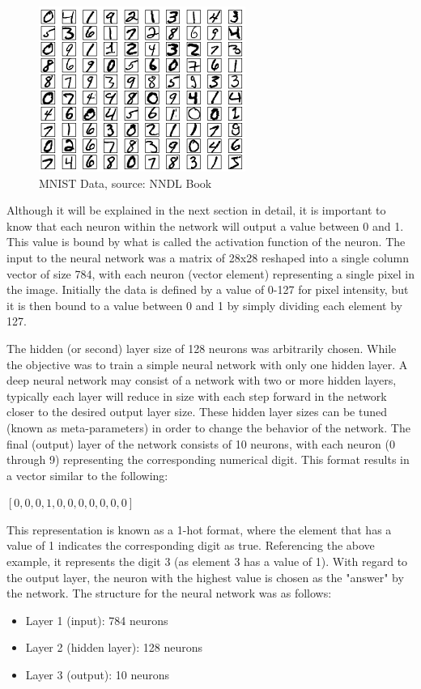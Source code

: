 \documentclass[11pt]{article}
\begin{document}
\begin{figure}[H]
	\centering
	\includegraphics[width=.4\textwidth]{mnist_100_digits.png}
	\caption{MNIST Data, source: NNDL Book}
\end{figure}

Although it will be explained in the next section in detail, it is important to know that each neuron within the network will output a value between 0 and 1. This value is bound by what is called the activation function of the neuron. The input to the neural network was a matrix of 28x28 reshaped into a single column vector of size 784, with each neuron (vector element) representing a single pixel in the image. Initially the data is defined by a value of 0-127 for pixel intensity, but it is then bound to a value between 0 and 1 by simply dividing each element by 127. 

The hidden (or second) layer size of 128 neurons was arbitrarily chosen. While the objective was to train a simple neural network with only one hidden layer. A deep neural network may consist of a network with two or more hidden layers, typically each layer will reduce in size with each step forward in the network closer to the desired output layer size. These hidden layer sizes can be tuned (known as meta-parameters) in order to change the behavior of the network. The final (output) layer of the network consists of 10 neurons, with each neuron (0 through 9) representing the corresponding numerical digit. This format results in a vector similar to the following:
\begin{center}
	$[ 0, 0, 0, 1, 0, 0, 0, 0, 0, 0, 0 ]$\\
\end{center}
This representation is known as a 1-hot format, where the element that has a value of 1 indicates the corresponding digit as true. Referencing the above example, it represents the digit 3 (as element 3 has a value of 1). With regard to the output layer, the neuron with the highest value is chosen as the "answer" by the network. The structure for the neural network was as follows:
\begin{itemize}
	\item Layer 1 (input): 784 neurons
	\item Layer 2 (hidden layer): 128 neurons
	\item Layer 3 (output): 10 neurons
\end{itemize}
\end{document}
